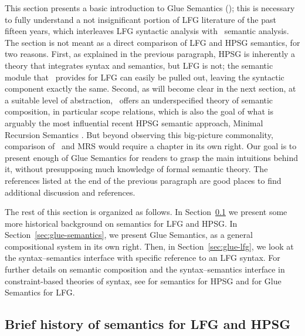 This section presents a basic introduction to Glue Semantics (\glue); this is necessary to fully understand a not insignificant portion of LFG literature of the past fifteen years, which  interleaves LFG syntactic analysis with \glue\ semantic analysis. The section is not meant as a direct comparison of LFG and HPSG semantics, for two reasons. First, as explained in the previous paragraph, HPSG is inherently a theory that integrates syntax and semantics, but LFG is not; the semantic module that \glue\ provides for LFG can easily be pulled out, leaving the syntactic component exactly the same.  Second, as will become clear in the next section, at a suitable level of abstraction, \glue\ offers an underspecified theory of semantic composition, in particular scope relations, which is also the goal of what is arguably the most influential recent HPSG semantic approach, Minimal Recursion Semantics \citep{copestake;ea05}. But beyond observing this big-picture commonality, comparison of \glue\ and MRS would require a chapter in its own right. 
Our goal is to present enough of Glue Semantics for readers to grasp the main intuitions behind it, without presupposing much knowledge of formal semantic theory.  The references listed at the end of the previous paragraph \citep[especially][]{dalrymple;ea19} are good places to find additional discussion and references.

The rest of this section is organized as follows. In Section~\ref{sec:background} we present some more historical background on semantics for LFG and HPSG.  In Section~\ref{sec:glue-semantics}, we present Glue Semantics, as a general compositional system in its own right. Then, in Section~\ref{sec:glue-lfg}, we look at the syntax--semantics interface with specific reference to an LFG syntax. For further details on semantic composition and the syntax--semantics interface in constraint-based theories of syntax, see  for semantics for HPSG and \citet{asudeh-lfg-glue} for Glue Semantics for LFG.

\subsection{Brief history of semantics for LFG and HPSG}
\label{sec:background}

